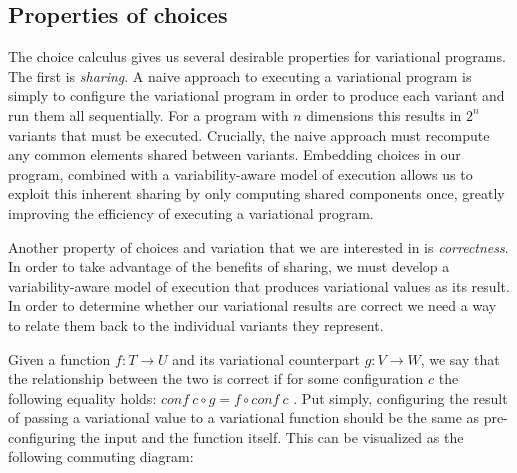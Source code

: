 \documentclass[letterpaper,10pt,onecolumn]{article}
\begin{document}
\subsection{Properties of choices}

The choice calculus gives us several desirable properties for variational programs.
The first is \emph{sharing}. A naive approach to executing a variational program is simply to
configure the variational program in order to produce each variant and run them all sequentially.
For a program with $n$ dimensions this results in $2^n$ variants that must be executed. Crucially,
the naive approach must recompute any common elements shared between variants. Embedding
choices in our program, combined with a variability-aware model of execution allows us to exploit this
inherent sharing by only computing shared components once, greatly improving the efficiency of
executing a variational program.

Another property of choices and variation that we are interested in is \emph{correctness}. In order
to take advantage of the benefits of sharing, we must develop a variability-aware model of execution
that produces variational values as its result. In order to determine whether our variational results
are correct we need a way to relate them back to the individual variants they represent.

Given a function $f : T \rightarrow U$ and its variational counterpart $g : V \rightarrow W$, we say that
the relationship between the two is correct if for some configuration $c$ the following equality holds:
$\mathit{conf}\ c \circ g = f \circ \mathit{conf}\ c$ \cite{hubbard2016formula}. Put simply, configuring the result
of passing a variational value to a variational function should be the same as pre-configuring the input
and the function itself. This can be visualized as the following commuting diagram:

\begin{center}
\end{center}
\end{document}
